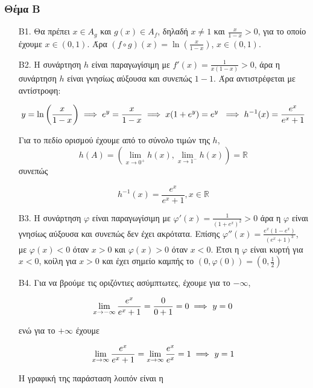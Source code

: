 \documentclass[12pt]{article}
\begin{document}
\part*{}

\section*{Θέμα Β}
  \begin{enumerate}
    \item [B1.] Θα πρέπει $x\in A_g$ και $g(x)\in A_f$, δηλαδή $x\ne1$ και $\frac{x}{1-x} > 0$, για το οποίο έχουμε $x\in (0,1)$. Άρα $(f\circ g)(x)=\ln \left( \frac{x}{1-x}\right)$, $x\in (0,1)$.

    \item [B2.] Η συνάρτηση $h$ είναι παραγωγίσιμη με $f'(x)=\frac{1}{x(1-x)}>0$, άρα η συνάρτηση $h$ είναι γνησίως αύξουσα και συνεπώς $1-1$. Άρα αντιστρέφεται με αντίστροφη:

      $$y=\ln \left( \frac{x}{1-x}\right) \implies e^y=\frac{x}{1-x} \implies x(1+e^y)=e^y \\\
      \implies h^{-1}(x)=\frac{e^x}{e^x+1}$$

      Για το πεδίο ορισμού έχουμε από το σύνολο τιμών της $h$,
      $$h(A)=\left(\lim_{x\to 0^+}h(x),\lim_{x\to 1^-}h(x)\right)=\mathbb{R}$$
      συνεπώς

      $$h^{-1}(x)=\frac{e^x}{e^x+1}, x\in \mathbb{R}$$

    \item [B3.] Η συνάρτηση $φ$ είναι παραγωγίσιμη με $φ'(x)=\displaystyle \frac{1}{(1+e^x)^2}>0$ άρα η $φ$ είναι γνησίως αύξουσα και συνεπώς δεν έχει ακρότατα. Επίσης $φ''(x)=\displaystyle \frac{e^x(1-e^x)}{(e^x+1)^3}$, με $φ(x)<0$ όταν $x>0$ και $φ(x)>0$ όταν $x<0$. Έτσι η $φ$ είναι κυρτή για $x<0$, κοίλη για $x>0$ και έχει σημείο καμπής το $(0,φ(0))=\left(0,\frac{1}{2}\right)$

    \item [B4.] Για να βρούμε τις οριζόντιες ασύμπτωτες, έχουμε για το $-\infty$,

      $$\lim_{x\to -\infty}\frac{e^x}{e^x+1}=\frac{0}{0+1}=0 \implies \\\ y=0$$

      ενώ για το $+\infty$ έχουμε

      $$\lim_{x\to \infty}\frac{e^x}{e^x+1}=\lim_{x\to \infty}\frac{e^x}{e^x}=1 \implies \\\ y=1$$

      Η γραφική της παράσταση λοιπόν είναι η
  \end{enumerate}
\end{document}
